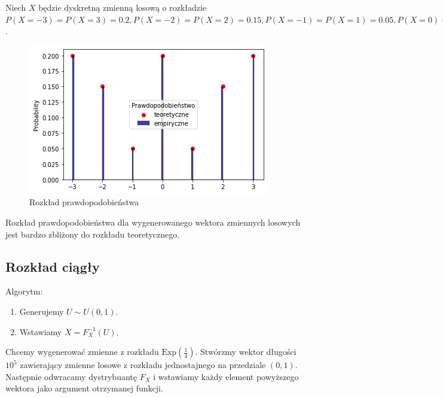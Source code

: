 \documentclass[12pt]{mwart}
\begin{document}
	\noindent Niech $X$ będzie dyskretną zmienną losową o rozkładzie $P\left( X=-3 \right) = P\left( X=3 \right) = 0.2 , P\left( X=-2 \right) = P\left( X=2 \right) = 0.15 , P\left( X=-1 \right) = P\left( X=1 \right) = 0.05 , P\left( X=0 \right) = 0.2 $.
	
	\begin{figure}[H]
		\begin{center}
			\includegraphics[scale=0.6]{dystrybuanta1.png}
			\caption{Rozkład prawdopodobieństwa}
		\end{center}
	\end{figure}
	
	\noindent Rozkład prawdopodobieństwa dla wygenerowanego wektora zmiennych losowych jest bardzo zbliżony do rozkładu teoretycznego.
	
	
	
	\subsection{Rozkład ciągły}	
	\noindent Algorytm:
	\begin{enumerate}
		\item Generujemy $U\sim U(0,1)$.
		\item Wstawiamy $X=F^{-1}_{X}\left( U \right) $. \\
	\end{enumerate}
	
	\noindent Chcemy wygenerować zmienne z rozkładu $ \mathrm{Exp} \left( \frac{1}{4} \right) $. Stwórzmy wektor długości $10^{5}$ zawierający zmienne losowe z rozkładu jednostajnego na przedziale $\left( 0,1 \right) $. Następnie odwracamy dystrybuantę $F_{X}$ i wstawiamy każdy element powyższego wektora jako argument otrzymanej funkcji.
	
\end{document}
